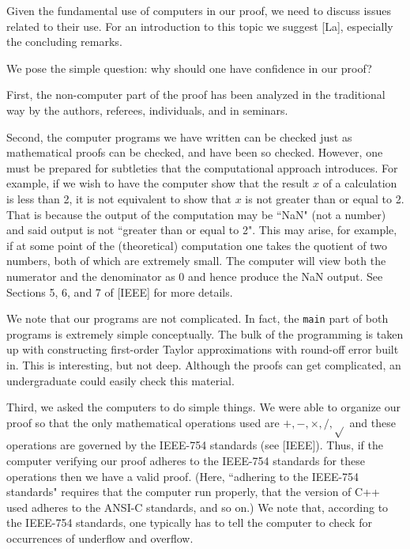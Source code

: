 Given the fundamental use of computers in our proof, we need to 
discuss issues related to their use.  For an introduction to this topic we 
suggest [La], especially the concluding remarks.

We pose the simple question: why should one have confidence in our proof?  

First, the non-computer part of the proof has been analyzed in the 
traditional way by the authors, referees, individuals, and in seminars.

Second, the computer programs we have written can be checked just as  
mathematical proofs can be checked, and have been so checked. However, 
one must be prepared for subtleties that the computational approach 
introduces.  For example, if we wish to have the computer show that 
the result $x$ of a calculation is less than 2, 
it is not equivalent to show that $x$ is not greater than or equal to 2. 
That is because the
output of the computation may be ``NaN" (not a number) and said output is
not ``greater than or equal to 2".  This may arise, for example, if at some 
point of the (theoretical)
computation one takes the quotient of two numbers, both of which are 
extremely small.  The computer will view both the numerator and the 
denominator as 0 and hence produce the NaN output.   See Sections 5, 6,  
and 7 of [IEEE]  for more  details.  

We note that our programs are not complicated. In fact, the {\tt main} part 
of both programs is extremely simple conceptually.  The bulk of the 
programming is taken up with constructing 
first-order Taylor approximations 
with round-off error built in.  This is interesting, but not deep.   Although 
the proofs can get complicated, an undergraduate could easily check this 
material. 
 
Third,  we asked the computers to do simple things.
We were able to organize our proof so that the only mathematical operations 
used are $+,-,\times,/,\sqrt{}$ and these operations are governed by the 
IEEE-754 standards (see [IEEE]).  Thus, if the computer verifying  our proof 
adheres to 
the IEEE-754 standards for these operations then we have a valid proof. 
(Here, ``adhering to the IEEE-754 standards" requires that the computer run 
properly, that the version of C++ used adheres to the ANSI-C standards, and 
so on.)  We note that, according to the IEEE-754 standards, one typically has 
to tell the computer to check for occurrences of underflow and overflow.

